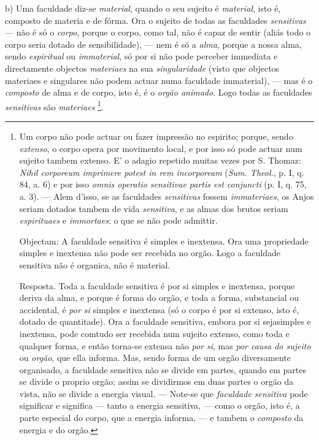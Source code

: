 b) Uma faculdade diz-se \emph{material}, quando o seu sujeito é \emph{material}, isto é, composto de materia e de fórma. Ora o sujeito de todas as faculdades \emph{sensitivas} --- não é só o \emph{corpo}, porque o corpo, como tal, não é capaz de sentir (aliás todo o corpo seria dotado de sensibilidade), --- nem é só a \emph{alma}, porque a nossa alma, sendo \emph{espiritual} ou \emph{immaterial}, só por si não pode perceber immediata e directamente objectos \emph{materiaes} na sua \emph{singularidade} (visto que objectos materiaes e singulares não podem actuar numa faculdade immaterial), --- mas é o \emph{composto} de alma e de corpo, isto é, é o \emph{orgão animado}. Logo todas as faculdades \emph{sensitivas} são \emph{materiaes} \footnote{Um corpo não pode actuar ou fazer impressão no espirito; porque, sendo \emph{extenso}, o corpo opera por movimento local, e por isso só pode actuar num sujeito tambem extenso. E' o adagio repetido muitas vezes por S. Thomaz: \emph{Nihil corporeum imprimere potest in rem incorpoream} (\emph{Sum. Theol.}, p. I, q. 84, a. 6) e por isso \emph{omnis operatio sensitivae partis est conjuncti} (p. I, q. 75, a. 3). --- Alem d'isso, se as faculdades \emph{sensitivas} fossem \emph{immateriaes}, os Anjos seriam dotados tambem de vida \emph{sensitiva}, e as almas dos brutos seriam \emph{espirituaes} e \emph{immortaes}: o que se não pode admittir.\par Objectam: A faculdade sensitiva é simples e inextensa. Ora uma propriedade simples e inextensa não pode ser recebida no orgão. Logo a faculdade sensitiva não é organica, não é material.\par Resposta. Toda a faculdade sensitiva é por si simples e inextensa, porque deriva da alma, e porque é forma do orgão, e toda a forma, substancial ou accidental, é \emph{por si} simples e inextensa (só o corpo é por si extenso, isto é, dotado de quantitade). Ora a faculdade sensitiva, embora por si sejasimples e inextensa, pode comtudo ser recebida num sujeito extenso, como toda e qualquer forma, e então torna-se extensa não \emph{por si}, mas \emph{por causa do sujeito} ou \emph{orgão}, que ella informa. Mas, sendo forma de um orgão diversamente organisado, a faculdade sensitiva não se divide em partes, quando em partes se divide o proprio orgão; assim se dividirmos em duas partes o orgão da vista, não se divide a energia visual. --- Note-se que \emph{faculdade sensitiva} pode significar e significa --- tanto a energia sensitiva, --- como o orgão, isto é, a parte especial do corpo, que a energia informa, --- e tambem o \emph{composto} da energia e do orgão.}.

